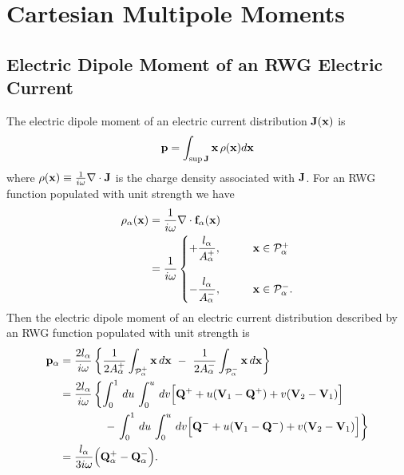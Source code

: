 \documentclass[letterpaper]{article}
\begin{document}
\newpage
\section{Cartesian Multipole Moments}

\subsection{Electric Dipole Moment of an RWG Electric Current}
The electric dipole moment of an electric current distribution $\mathbf{J}(\mathbf{x})$ is 
$$\mathbf{p}= \int_{\sup \mathbf{J}}  \mathbf{x}\, \rho(\mathbf{x}) d\mathbf{x} $$
where $\rho(\mathbf{x})\equiv \frac{1}{i\omega}\nabla \cdot \mathbf{J}$ is the charge 
density associated with $\mathbf{J}$. For an RWG function populated with unit 
strength we have 
\begin{align} 
 \rho_\alpha(\mathbf{x}) 
 &=\frac{1}{i\omega}\nabla \cdot \mathbf{f}_\alpha(\mathbf{x}) \nonumber \\
 &=\frac{1}{i\omega}
   \begin{cases} 
    +\displaystyle{\frac{l_\alpha}{A^+_\alpha}}, 
     \qquad &\mathbf{x} \in \mathcal{P}_\alpha^+ \\\\
    -\displaystyle{\frac{l_\alpha}{A^-_\alpha}}, 
      \qquad &\mathbf{x} \in \mathcal{P}_\alpha^-.
   \end{cases} \label{rhoRWG}
\end{align} 
Then the electric dipole moment of an electric current distribution 
described by an RWG function populated with unit strength is 
\begin{align*}
  \mathbf{p}_\alpha 
&= \frac{2l_\alpha}{i\omega}
   \left\{ 
   \frac{1}{2A^+_\alpha} \int_{\mathcal{P}_\alpha^+} \mathbf{x} \,d\mathbf{x}  
   \,\,- \,\,
   \frac{1}{2A^-_\alpha} \int_{\mathcal{P}_\alpha^-} \mathbf{x} \, d\mathbf{x} 
   \right\}  \\
&= \frac{2l_\alpha}{i\omega}
   \left\{ 
            \int_0^1 \,du\,\int_0^u \, dv 
            \Big[ \mathbf{Q}^+ + u(\mathbf{V}_1-\mathbf{Q}^+) + v(\mathbf{V}_2 - \mathbf{V}_1)  \Big]
   \right. \\
&  \qquad \qquad- 
   \left. 
            \int_0^1 \,du\,\int_0^u \, dv 
            \Big[ \mathbf{Q}^- + u(\mathbf{V}_1-\mathbf{Q}^-) + v(\mathbf{V}_2 - \mathbf{V}_1)  \Big]
   \right\} \\
&= \frac{l_\alpha}{3 i\omega}\Big(\mathbf{Q}^+_\alpha - \mathbf{Q}^-_\alpha\Big).
\end{align*}
\end{document}
